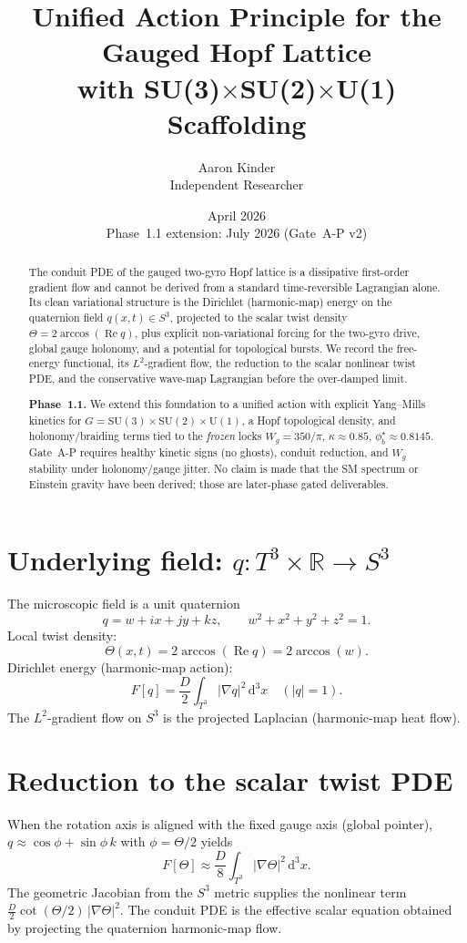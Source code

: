 \documentclass[11pt]{article}
\title{Unified Action Principle for the Gauged Hopf Lattice\\
\large with SU(3)$\times$SU(2)$\times$U(1) Scaffolding}
\author{Aaron Kinder \\ Independent Researcher}
\date{April 2026 \\ \small Phase~1.1 extension: July 2026 (Gate~A-P v2)}
\begin{document}
\maketitle

\begin{abstract}
The conduit PDE of the gauged two-gyro Hopf lattice is a dissipative first-order
gradient flow and cannot be derived from a standard time-reversible Lagrangian alone.
Its clean variational structure is the Dirichlet (harmonic-map) energy on the
quaternion field $q(x,t)\in S^3$, projected to the scalar twist density
$\Theta=2\arccos(\operatorname{Re} q)$, plus explicit non-variational forcing for
the two-gyro drive, global gauge holonomy, and a potential for topological bursts.
We record the free-energy functional, its $L^2$-gradient flow, the reduction to the
scalar nonlinear twist PDE, and the conservative wave-map Lagrangian before the
over-damped limit.

\textbf{Phase~1.1.} We extend this foundation to a unified action with explicit
Yang--Mills kinetics for $G=\mathrm{SU}(3)\times\mathrm{SU}(2)\times\mathrm{U}(1)$,
a Hopf topological density, and holonomy/braiding terms tied to the
\emph{frozen} locks $W_g=350/\pi$, $\kappa\approx 0.85$, $\phi_b^\star\approx 0.8145$.
Gate~A-P requires healthy kinetic signs (no ghosts), conduit reduction, and
$W_g$ stability under holonomy/gauge jitter. No claim is made that the SM spectrum
or Einstein gravity have been derived; those are later-phase gated deliverables.
\end{abstract}

\section{Underlying field: $q:T^3\times\mathbb{R}\to S^3$}

The microscopic field is a unit quaternion
\[
q=w+ix+jy+kz,\qquad w^2+x^2+y^2+z^2=1.
\]
Local twist density:
\[
\Theta(x,t)=2\arccos(\operatorname{Re} q)=2\arccos(w).
\]
Dirichlet energy (harmonic-map action):
\[
F[q]=\frac{D}{2}\int_{T^3}|\nabla q|^2\,\mathrm{d}^3x
\quad(|q|=1).
\]
The $L^2$-gradient flow on $S^3$ is the projected Laplacian (harmonic-map heat flow).

\section{Reduction to the scalar twist PDE}

When the rotation axis is aligned with the fixed gauge axis (global pointer),
$q\approx\cos\phi+\sin\phi\,k$ with $\phi=\Theta/2$ yields
\[
F[\Theta]\approx\frac{D}{8}\int_{T^3}|\nabla\Theta|^2\,\mathrm{d}^3x.
\]
The geometric Jacobian from the $S^3$ metric supplies the nonlinear term
$\tfrac{D}{2}\cot(\Theta/2)\,|\nabla\Theta|^2$. The conduit PDE is the effective
scalar equation obtained by projecting the quaternion harmonic-map flow.
\end{document}
